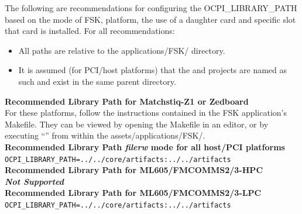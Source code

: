 \noindent The following are recommendations for configuring the OCPI\_LIBRARY\_PATH based on the mode of FSK, platform, the use of a daughter card and specific slot that card is installed. For all recommendations:
\begin{itemize}
  \item All paths are relative to the applications/FSK/ directory.\\
  \item It is assumed (for PCI/host platforms) that the  and  projects are named as such and exist in the same parent directory.\\
\end{itemize}

\noindent\textbf{Recommended Library Path for Matchstiq-Z1 or Zedboard}\\

\noindent
For these platforms, follow the instructions contained in the FSK application's Makefile. They can be viewed by opening the Makefile in an editor, or by executing ``'' from within the assets/applications/FSK/.\\

\noindent\textbf{Recommended Library Path \textit{filerw} mode for all host/PCI platforms}\\
\noindent
\verb|OCPI_LIBRARY_PATH=../../core/artifacts:../../artifacts| \\

\noindent\textbf{Recommended Library Path for ML605/FMCOMMS2/3-HPC}\\

\noindent
\noindent\textbf{\textit{Not Supported}}\\

\noindent\textbf{Recommended Library Path for ML605/FMCOMMS2/3-LPC}\\

\noindent
\verb|OCPI_LIBRARY_PATH=../../core/artifacts:../../artifacts| \\
\par\medskip

\pagebreak

